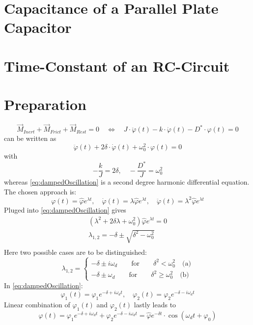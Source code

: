 \section*{Capacitance of a Parallel Plate Capacitor}
\section*{Time-Constant of an RC-Circuit}
%
\section{Preparation}
%
\begin{equation}
    \vec{M}_{ Inert } + \vec{M}_{ Frict } + \vec{ M}_{ Rest } = 0 \quad \Leftrightarrow \quad J \cdot \ddot\varphi(t) - k \cdot \dot\varphi(t) - D^* \cdot \varphi(t) = 0
\end{equation}
can be written as
\begin{equation}
    \ddot\varphi(t) + 2 \delta \cdot \dot\varphi(t) + \omega_0^2 \cdot \varphi(t) = 0
    \label{eq:dampedOscillation}
\end{equation}
with
\begin{equation}
    -\frac{k}{J} = 2\delta, \quad -\frac{D^*}{J} = \omega_0^2
\end{equation}
whereas \cref{eq:dampedOscillation} is a second degree harmonic differential equation.
The chosen approach is:
\begin{equation}
    \varphi(t) = \hat{\varphi} e^{\lambda t}, \quad \dot{\varphi}(t) = \lambda \hat{\varphi} e^{\lambda t}, \quad \ddot{\varphi}(t) = \lambda^2 \hat{\varphi} e^{\lambda t}
\end{equation}
Pluged into \cref{eq:dampedOscillation} gives
\begin{align}
    \left(\lambda^2 + 2\delta \lambda + \omega_0^2\right) \hat{\varphi}e^{\lambda t} = 0 \nonumber \\
    \lambda_{1,2} = -\delta \pm \sqrt{\delta^2-\omega_0^2} \nonumber \\
\end{align}
Here two possible cases are to be distinguished:
\begin{equation}
    \lambda_{1,2} =
    \begin{cases}
        -\delta \pm i\omega_d \qquad \text{for} \qquad \delta^2 < \omega_0^2 \quad \text{(a)}\\
        -\delta \pm \omega_d \qquad \text{for} \qquad \delta^2 \geq \omega_0^2 \quad \text{(b)}
    \end{cases}
\end{equation}
In \cref{eq:dampedOscillation}:
\begin{equation}
    \varphi_1(t) = \varphi_1 e^{-\delta + i\omega_d t}, \quad \varphi_2(t) = \varphi_2 e^{-\delta - i\omega_d t}
\end{equation}
Linear combination of \( \varphi_1(t) \) and \( \varphi_2(t) \) lastly leads to
\begin{equation}
    \varphi(t) = \varphi_1 e^{-\delta + i\omega_d t} + \varphi_2 e^{-\delta - i\omega_d t} = \hat{\varphi}e^{-\delta t} \cdot \cos{\left( \omega_d t + \varphi_0 \right)}
\end{equation}